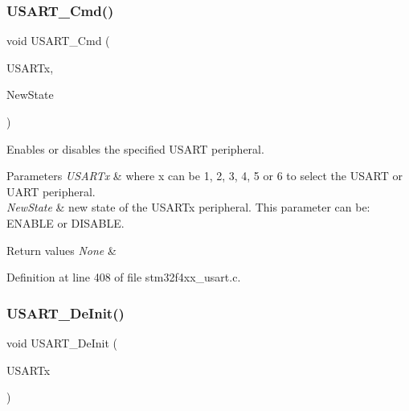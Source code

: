 \subsubsection{\texorpdfstring{U\+S\+A\+R\+T\+\_\+\+Cmd()}{USART\_Cmd()}}
{\footnotesize\ttfamily void U\+S\+A\+R\+T\+\_\+\+Cmd (\begin{DoxyParamCaption}\item[{\hyperlink{struct_u_s_a_r_t___type_def}{U\+S\+A\+R\+T\+\_\+\+Type\+Def} $\ast$}]{U\+S\+A\+R\+Tx,  }\item[{Functional\+State}]{New\+State }\end{DoxyParamCaption})}



Enables or disables the specified U\+S\+A\+RT peripheral. 


\begin{DoxyParams}{Parameters}
{\em U\+S\+A\+R\+Tx} & where x can be 1, 2, 3, 4, 5 or 6 to select the U\+S\+A\+RT or U\+A\+RT peripheral. \\
\hline
{\em New\+State} & new state of the U\+S\+A\+R\+Tx peripheral. This parameter can be\+: E\+N\+A\+B\+LE or D\+I\+S\+A\+B\+LE. \\
\hline
\end{DoxyParams}

\begin{DoxyRetVals}{Return values}
{\em None} & \\
\hline
\end{DoxyRetVals}


Definition at line 408 of file stm32f4xx\+\_\+usart.\+c.

\mbox{\label{group___u_s_a_r_t___group1_ga2f8e1ce72da21b6539d8e1f299ec3b0d}} 
\subsubsection{\texorpdfstring{U\+S\+A\+R\+T\+\_\+\+De\+Init()}{USART\_DeInit()}}
{\footnotesize\ttfamily void U\+S\+A\+R\+T\+\_\+\+De\+Init (\begin{DoxyParamCaption}\item[{\hyperlink{struct_u_s_a_r_t___type_def}{U\+S\+A\+R\+T\+\_\+\+Type\+Def} $\ast$}]{U\+S\+A\+R\+Tx }\end{DoxyParamCaption})}



